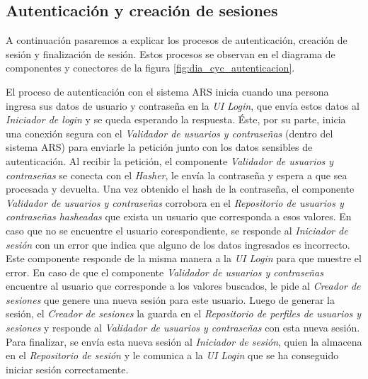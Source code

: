 \subsection{Autenticación y creación de sesiones}

\par A continuación pasaremos a explicar los procesos de autenticación, creación de sesión y finalización de sesión. Estos procesos se observan en el diagrama de componentes y conectores de la figura \ref{fig:dia_cyc_autenticacion}. \\

\par El proceso de autenticación con el sistema ARS inicia cuando una persona ingresa sus datos de usuario y contraseña en la \textit{UI Login}, que envía estos datos al \textit{Iniciador de login} y se queda esperando la respuesta. Éste, por su parte, inicia una conexión segura con el \textit{Validador de usuarios y contraseñas} (dentro del sistema ARS) para enviarle la petición junto con los datos sensibles de autenticación. Al recibir la petición, el componente \textit{Validador de usuarios y contraseñas} se conecta con el \textit{Hasher}, le envía la contraseña y espera a que sea procesada y devuelta. Una vez obtenido el hash de la contraseña, el componente \textit{Validador de usuarios y contraseñas} corrobora en el \textit{Repositorio de usuarios y contraseñas hasheadas} que exista un usuario que corresponda a esos valores. En caso que no se encuentre el usuario corespondiente, se responde al \textit{Iniciador de sesión} con un error que indica que alguno de los datos ingresados es incorrecto. Este componente responde de la misma manera a la \textit{UI Login} para que muestre el error. En caso de que el componente \textit{Validador de usuarios y contraseñas} encuentre al usuario que corresponde a los valores buscados, le pide al \textit{Creador de sesiones} que genere una nueva sesión para este usuario. Luego de generar la sesión, el \textit{Creador de sesiones} la guarda en el \textit{Repositorio de perfiles de usuarios y sesiones} y responde al \textit{Validador de usuarios y contraseñas} con esta nueva sesión. Para finalizar, se envía esta nueva sesión al \textit{Iniciador de sesión}, quien la almacena en el \textit{Repositorio de sesión} y le comunica a la \textit{UI Login} que se ha conseguido iniciar sesión correctamente. \\

